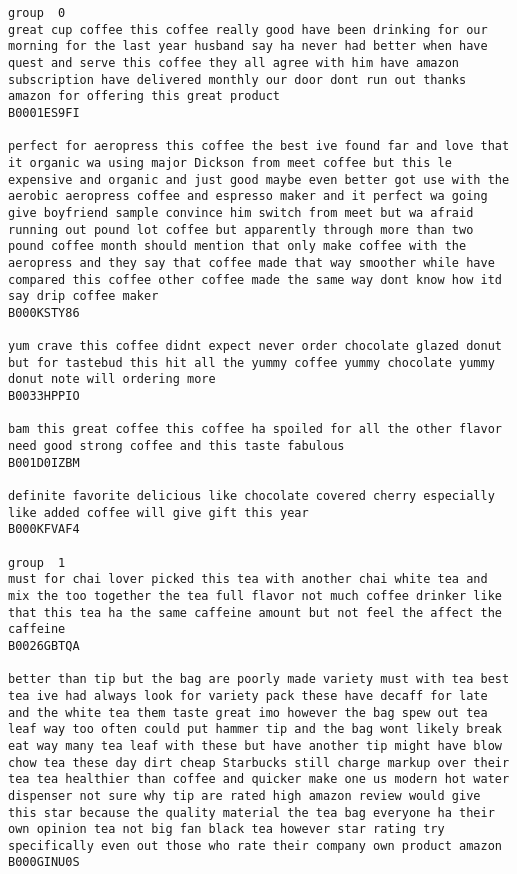 \documentclass[11pt]{article}
\begin{document}
    \begin{Verbatim}[commandchars=\\\{\}]
group  0
great cup coffee this coffee really good have been drinking for our morning for the last year husband say ha never had better when have quest and serve this coffee they all agree with him have amazon subscription have delivered monthly our door dont run out thanks amazon for offering this great product
B0001ES9FI

perfect for aeropress this coffee the best ive found far and love that it organic wa using major Dickson from meet coffee but this le expensive and organic and just good maybe even better got use with the aerobic aeropress coffee and espresso maker and it perfect wa going give boyfriend sample convince him switch from meet but wa afraid running out pound lot coffee but apparently through more than two pound coffee month should mention that only make coffee with the aeropress and they say that coffee made that way smoother while have compared this coffee other coffee made the same way dont know how itd say drip coffee maker
B000KSTY86

yum crave this coffee didnt expect never order chocolate glazed donut but for tastebud this hit all the yummy coffee yummy chocolate yummy donut note will ordering more
B0033HPPIO

bam this great coffee this coffee ha spoiled for all the other flavor need good strong coffee and this taste fabulous
B001D0IZBM

definite favorite delicious like chocolate covered cherry especially like added coffee will give gift this year
B000KFVAF4

group  1
must for chai lover picked this tea with another chai white tea and mix the too together the tea full flavor not much coffee drinker like that this tea ha the same caffeine amount but not feel the affect the caffeine
B0026GBTQA

better than tip but the bag are poorly made variety must with tea best tea ive had always look for variety pack these have decaff for late and the white tea them taste great imo however the bag spew out tea leaf way too often could put hammer tip and the bag wont likely break eat way many tea leaf with these but have another tip might have blow chow tea these day dirt cheap Starbucks still charge markup over their tea tea healthier than coffee and quicker make one us modern hot water dispenser not sure why tip are rated high amazon review would give this star because the quality material the tea bag everyone ha their own opinion tea not big fan black tea however star rating try specifically even out those who rate their company own product amazon
B000GINU0S


\end{Verbatim}
\end{document}
